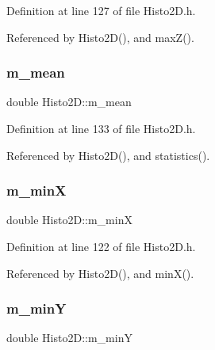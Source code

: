 Definition at line 127 of file Histo2\+D.\+h.



Referenced by Histo2\+D(), and max\+Z().

\mbox{\label{classHisto2D_a78286e1d11cc657a5fd1bd1f60c8dff9}} 
\subsubsection{\texorpdfstring{m\+\_\+mean}{m\_mean}}
{\footnotesize\ttfamily double Histo2\+D\+::m\+\_\+mean\hspace{0.3cm}{\ttfamily [private]}}



Definition at line 133 of file Histo2\+D.\+h.



Referenced by Histo2\+D(), and statistics().

\mbox{\label{classHisto2D_a039d7f45ec8b5b84c1d71f8f87884211}} 
\subsubsection{\texorpdfstring{m\+\_\+minX}{m\_minX}}
{\footnotesize\ttfamily double Histo2\+D\+::m\+\_\+minX\hspace{0.3cm}{\ttfamily [private]}}



Definition at line 122 of file Histo2\+D.\+h.



Referenced by Histo2\+D(), and min\+X().

\mbox{\label{classHisto2D_a5bea9523f4ac077b0cc72cc1b28e0834}} 
\subsubsection{\texorpdfstring{m\+\_\+minY}{m\_minY}}
{\footnotesize\ttfamily double Histo2\+D\+::m\+\_\+minY\hspace{0.3cm}{\ttfamily [private]}}



